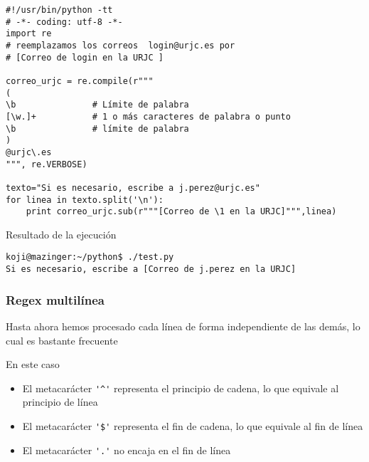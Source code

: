 \documentclass[ucs]{beamer}
\begin{document}
\begin{frame}[fragile]
 
  \begin{scriptsize}
  \begin{verbatim}
#!/usr/bin/python -tt
# -*- coding: utf-8 -*-
import re
# reemplazamos los correos  login@urjc.es por 
# [Correo de login en la URJC ]

correo_urjc = re.compile(r"""
(
\b               # Límite de palabra
[\w.]+           # 1 o más caracteres de palabra o punto
\b               # límite de palabra
)
@urjc\.es
""", re.VERBOSE)

texto="Si es necesario, escribe a j.perez@urjc.es"
for linea in texto.split('\n'):
    print correo_urjc.sub(r"""[Correo de \1 en la URJC]""",linea)
  \end{verbatim}
  \end{scriptsize}
Resultado de la ejecución
  \begin{scriptsize}
  \begin{verbatim}
koji@mazinger:~/python$ ./test.py 
Si es necesario, escribe a [Correo de j.perez en la URJC]
  \end{verbatim}
  \end{scriptsize}

\end{frame}



\begin{frame}[fragile]
\frametitle{Regex multilínea}
Hasta ahora hemos procesado cada línea
de forma independiente de las demás, lo cual es bastante
frecuente

En este caso
\begin{itemize}
\item
El metacarácter \verb|'^'| representa el principio de cadena,
lo que equivale al principio de línea
\item
El metacarácter \verb|'$'| representa el fin de cadena,
lo que equivale al fin de línea
\item
El metacarácter \verb|'.'| no encaja en el fin de línea
\end{itemize}

\end{frame}
\end{document}
